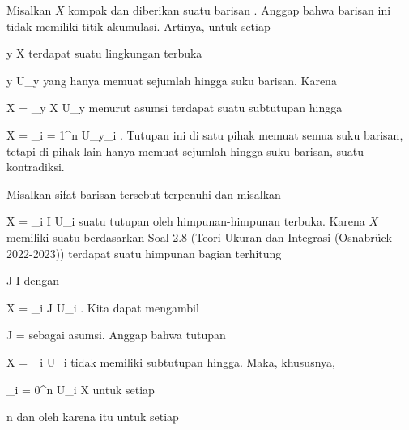 {

\teilbeweis {}{}{}
{Misalkan $X$ kompak dan diberikan suatu barisan
.
Anggap bahwa barisan ini tidak memiliki titik akumulasi. Artinya, untuk setiap

\mavergleichskette
{\vergleichskette
{ y
}
{ \in }{ X
}
{  }{
}
{    }{
}
{   }{
}
}
{}{}{}
terdapat suatu lingkungan terbuka

\mavergleichskette
{\vergleichskette
{ y
}
{ \in }{ U_y
}
{  }{
}
{    }{
}
{   }{
}
}
{}{}{}
yang hanya memuat sejumlah hingga suku barisan. Karena

\mavergleichskettedisp
{\vergleichskette
{ X
}
{ =} { \bigcup_{y \in X} U_y
}
{ } {
}
{ } {
}
{ } {
}
}
{}{}{}
menurut asumsi terdapat suatu subtutupan hingga

\mavergleichskettedisp
{\vergleichskette
{ X
}
{ =} { \bigcup_{i = 1}^n U_{y_i }
}
{ } {
}
{ } {
}
{ } {
}
}
{}{}{.} Tutupan ini di satu pihak memuat semua suku barisan, tetapi di pihak lain hanya memuat sejumlah hingga suku barisan, suatu kontradiksi.}
{}

\teilbeweis {}{}{}
{Misalkan sifat barisan tersebut terpenuhi dan misalkan

\mavergleichskette
{\vergleichskette
{ X
}
{ = }{ \bigcup_{i \in I} U_i
}
{  }{
}
{    }{
}
{   }{
}
}
{}{}{}
suatu tutupan oleh himpunan-himpunan terbuka. Karena $X$ memiliki suatu
berdasarkan
Soal 2.8 (Teori Ukuran dan Integrasi (Osnabrück 2022-2023))
terdapat suatu himpunan bagian terhitung

\mavergleichskette
{\vergleichskette
{ J
}
{ \subseteq }{ I
}
{  }{
}
{    }{
}
{   }{
}
}
{}{}{}
dengan

\mavergleichskettedisp
{\vergleichskette
{ X
}
{ =} { \bigcup_{i \in J} U_i
}
{ } {
}
{ } {
}
{ } {
}
}
{}{}{.}
Kita dapat mengambil

\mavergleichskette
{\vergleichskette
{ J
}
{ = }{ \N
}
{  }{
}
{    }{
}
{   }{
}
}
{}{}{}
sebagai asumsi. Anggap bahwa tutupan

\mavergleichskette
{\vergleichskette
{ X
}
{ = }{ \bigcup_{i \in \N} U_i
}
{  }{
}
{    }{
}
{   }{
}
}
{}{}{}
tidak memiliki subtutupan hingga. Maka, khususnya,

\mavergleichskette
{\vergleichskette
{ \bigcup_{i = 0}^n  U_i
}
{ \neq }{ X
}
{  }{
}
{    }{
}
{   }{
}
}
{}{}{}
untuk setiap

\mavergleichskette
{\vergleichskette
{ n
}
{ \in }{ \N
}
{  }{
}
{    }{
}
{   }{
}
}
{}{}{}
dan oleh karena itu untuk setiap

}}
